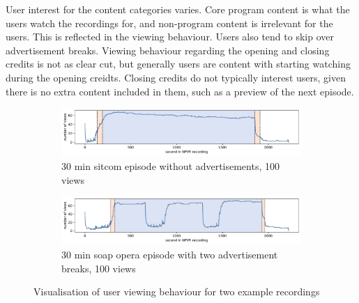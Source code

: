 User interest for the content categories varies. Core program content is what the users watch the recordings for, and non-program content is irrelevant for the users. This is reflected in the viewing behaviour. Users also tend to skip over advertisement breaks. Viewing behaviour regarding the opening and closing credits is not as clear cut, %
but generally users are content with starting watching during the opening creidts. Closing credits do not typically interest users, given there is no extra content included in them, such as a preview of the next episode. 


\begin{figure}[h]
    \centering
    \begin{subfigure}[b]{\textwidth}
       \includegraphics[width=1\textwidth]{../plots/sitcom.pdf}
       \caption{30 min sitcom episode without advertisements, 100 views}
       \label{fig:sitcom_viewing_behaviour} 
    \end{subfigure}
    \par\bigskip
    \begin{subfigure}[b]{\textwidth}
       \includegraphics[width=1\textwidth]{../plots/soap_opera.pdf}
       \caption{30 min soap opera episode with two advertisement breaks, 100 views}
       \label{fig:soap_opera_viewing_behaviour}
    \end{subfigure}
    \caption{Visualisation of user viewing behaviour for two example recordings}
    \label{fig:user_viewing_behaviour}
\end{figure}

